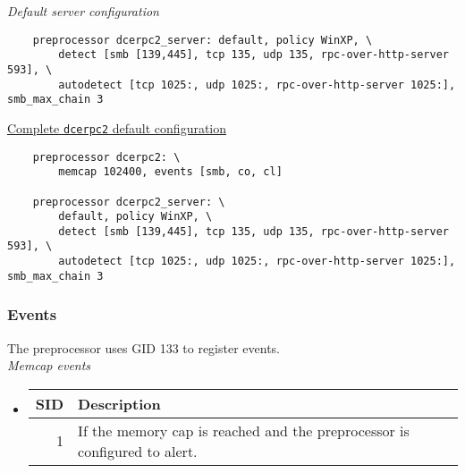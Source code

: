 \documentclass[english]{report}
\begin{document}
\textit{Default server configuration}
\footnotesize
\begin{verbatim}
    preprocessor dcerpc2_server: default, policy WinXP, \
        detect [smb [139,445], tcp 135, udp 135, rpc-over-http-server 593], \
        autodetect [tcp 1025:, udp 1025:, rpc-over-http-server 1025:], smb_max_chain 3
\end{verbatim}
\normalsize

\underline{Complete \texttt{dcerpc2} default configuration}
\footnotesize
\begin{verbatim}
    preprocessor dcerpc2: \
        memcap 102400, events [smb, co, cl]

    preprocessor dcerpc2_server: \
        default, policy WinXP, \
        detect [smb [139,445], tcp 135, udp 135, rpc-over-http-server 593], \
        autodetect [tcp 1025:, udp 1025:, rpc-over-http-server 1025:], smb_max_chain 3
\end{verbatim}
\normalsize

\subsubsection{Events}
The preprocessor uses GID 133 to register events.\\

\textit{Memcap events}
\begin{itemize}
\item[]

\begin{longtable}{|r|p{13.5cm}|}

\hline
SID & Description\\
\hline

\hline
  1 &

If the memory cap is reached and the preprocessor is configured to alert.\\

\hline
\end{longtable}
\end{itemize}
\end{document}

